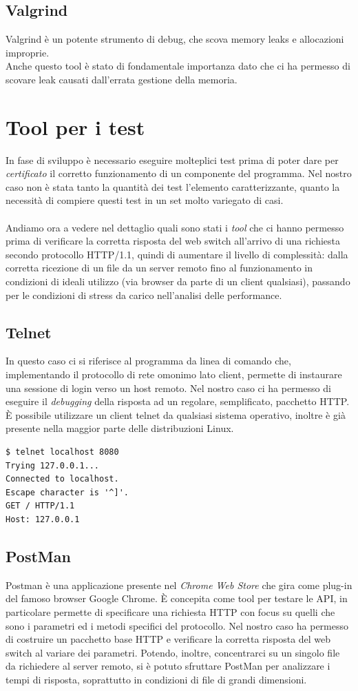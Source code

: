 \documentclass[italian]{tktltiki2}
\begin{document}
\subsection{Valgrind}
Valgrind\cite{valgrind} è un potente strumento di debug, che scova memory leaks e allocazioni improprie.
\\
Anche questo tool è stato di fondamentale importanza dato che ci ha permesso di scovare leak causati dall'errata gestione della memoria.

\newpage
\section{Tool per i test}
In fase di sviluppo è necessario eseguire molteplici test prima di poter dare per \emph{certificato} il corretto funzionamento di un componente del programma. Nel nostro caso non è stata tanto la quantità dei test l'elemento caratterizzante, quanto la necessità di compiere questi test in un set molto variegato di casi. 
\\
\\
Andiamo ora a vedere nel dettaglio quali sono stati i \emph{tool} che ci hanno permesso prima di verificare la corretta risposta del web switch all'arrivo di una richiesta secondo protocollo HTTP/1.1, quindi di aumentare il livello di complessità: dalla corretta ricezione di un file da un server remoto fino al funzionamento in condizioni di ideali utilizzo (via browser da parte di un client qualsiasi), passando per le condizioni di stress da carico nell'analisi delle performance.
\subsection{Telnet}
In questo caso ci si riferisce al programma da linea di comando che, implementando il protocollo di rete omonimo lato client, permette di instaurare una sessione di login verso un host remoto. Nel nostro caso ci ha permesso di eseguire il \emph{debugging} della risposta ad un regolare, semplificato, pacchetto HTTP. È possibile utilizzare un client telnet da qualsiasi sistema operativo, inoltre è già presente nella maggior parte delle distribuzioni Linux.
\begin{lstlisting}
$ telnet localhost 8080
Trying 127.0.0.1...
Connected to localhost.
Escape character is '^]'.
GET / HTTP/1.1
Host: 127.0.0.1
\end{lstlisting}
\subsection{PostMan}
Postman\cite{postman} è una applicazione presente nel \emph{Chrome Web Store} che gira come plug-in del famoso browser Google Chrome. È concepita come tool per testare le API, in particolare permette di specificare una richiesta HTTP con focus su quelli che sono i parametri ed i metodi specifici del protocollo. Nel nostro caso ha permesso di costruire un pacchetto base HTTP e verificare la corretta risposta del web switch al variare dei parametri. Potendo, inoltre, concentrarci su un singolo file da richiedere al server remoto, si è potuto sfruttare PostMan per analizzare i tempi di risposta, soprattutto in condizioni di file di grandi dimensioni.
\end{document}
